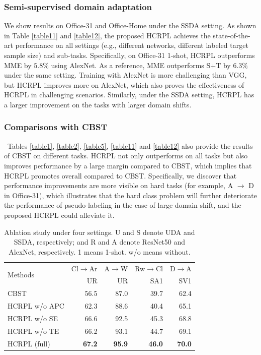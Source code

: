 \documentclass[a4paper,fleqn]{cas-dc}
\begin{document}
	\subsubsection{Semi-supervised domain adaptation} We show results on Office-31 and Office-Home under the SSDA setting. As shown in Table \ref{table11} and \ref{table12}, the proposed HCRPL achieves the state-of-the-art performance on all settings (e.g., different networks, different labeled target sample size) and sub-tasks. Specifically, on Office-31 1-shot, HCRPL outperforms MME by $5.8\%$ using AlexNet. As a reference, MME outperforms S+T by $6.3\%$ under the same setting. Training with AlexNet is more challenging than VGG, but HCRPL improves more on AlexNet, which also proves the effectiveness of HCRPL in challenging scenarios. Similarly, under the SSDA setting, HCRPL has a larger improvement on the tasks with larger domain shifts.
	
	\subsubsection{Comparisons with CBST}\ Tables \ref{table1}, \ref{table2}, \ref{table5}, \ref{table11} and \ref{table12} also provide the results of CBST on different tasks. HCRPL not only outperforms on all tasks but also improves performance by a large margin compared to CBST, which implies that HCRPL promotes overall compared to CBST. Specifically, we discover that performance improvements are more visible on hard tasks (for example, {A $\rightarrow$ D} in Office-31), which illustrates that the hard class problem will further deteriorate the performance of pseudo-labeling in the case of large domain shift, and the proposed HCRPL could alleviate it.
	
	
	\begin{table}
		\centering
		\caption{Ablation study under four settings. U and S denote UDA and SSDA, respectively; and R and A denote ResNet50 and AlexNet, respectively. 1 means 1-shot. w/o means without.}
		\begin{tabular}{lrrrr}
			\toprule
			\multirow{2}{*}{Methods}  & Cl$\rightarrow$Ar & A$\rightarrow$W & Rw$\rightarrow$Cl & D$\rightarrow$A\\
			~ & UR & UR & SA1 & SV1 \\
			\midrule
			CBST    & 56.5  & 87.0 &  39.7 & 62.4   \\
			HCRPL w/o APC    & 62.3  & 88.6  & 40.4  & 65.1  \\
			HCRPL w/o SE    & 66.6  & 92.5    & 45.3 &  68.8 \\
			HCRPL w/o TE    & 66.2  & 93.1     & 44.7 & 69.1\\
			HCRPL (full)      & \textbf{67.2}  & \textbf{95.9}  & \textbf{46.0}   & \textbf{70.0} \\
			\bottomrule
		\end{tabular}
		\label{table4}
	\end{table}
	
\end{document}
